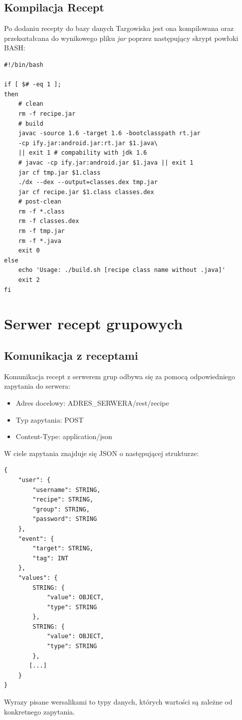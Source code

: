 \documentclass[11pt,a4paper,polish,thesis]{dcsbook}
\begin{document}
\subsection{Kompilacja Recept}
Po dodaniu recepty do bazy danych Targowiska jest ona kompilowana oraz przekształcana do wynikowego pliku \emph{jar} poprzez następujący skrypt powłoki BASH:
\begin{verbatim}
#!/bin/bash

if [ $# -eq 1 ];
then
    # clean
    rm -f recipe.jar
    # build
    javac -source 1.6 -target 1.6 -bootclasspath rt.jar
    -cp ify.jar:android.jar:rt.jar $1.java\
    || exit 1 # compability with jdk 1.6
    # javac -cp ify.jar:android.jar $1.java || exit 1
    jar cf tmp.jar $1.class
    ./dx --dex --output=classes.dex tmp.jar
    jar cf recipe.jar $1.class classes.dex
    # post-clean
    rm -f *.class
    rm -f classes.dex
    rm -f tmp.jar
    rm -f *.java
    exit 0
else
    echo 'Usage: ./build.sh [recipe class name without .java]'
    exit 2
fi
\end{verbatim}
\section{Serwer recept grupowych}
\subsection{Komunikacja z receptami}
Komunikacja recept z serwerem grup odbywa się za pomocą odpowiedniego zapytania do serwera:
\begin{itemize}
\item Adres docelowy: ADRES\_SERWERA/rest/recipe
\item Typ zapytania: POST
\item Content-Type: application/json
\end{itemize}

W ciele zapytania znajduje się JSON o następującej strukturze:
\begin{verbatim}
{
    "user": {
        "username": STRING,
        "recipe": STRING,
        "group": STRING,
        "password": STRING
    },
    "event": {
        "target": STRING,
        "tag": INT
    },
    "values": {
        STRING: {
            "value": OBJECT,
            "type": STRING
        },
        STRING: {
            "value": OBJECT,
            "type": STRING
        },
       [...]
    }
}
\end{verbatim}

Wyrazy pisane wersalikami to typy danych, których wartości są zależne od konkretnego zapytania.
\end{document}
